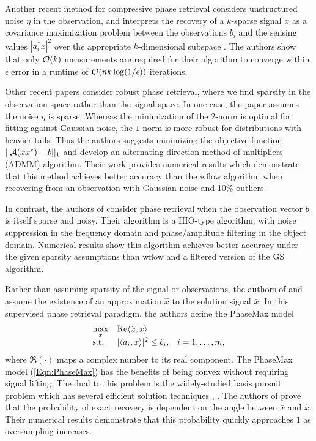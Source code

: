 Another recent method for compressive phase retrieval considers unstructured noise $\eta$ in the observation, and interprets the recovery of a $k$-sparse signal $x$ as a covariance maximization problem between the observations $b_i$ and the sensing values $|a_i^*x|^2$ over the appropriate $k$-dimensional subspace \cite{zhang2017fast}.  The authors show that only ${\mathcal O}(k)$ measurements are required for their algorithm to converge within $\epsilon$ error in a runtime of ${\mathcal O}(nk \log(1/ \epsilon))$ iterations.




Other recent papers consider robust phase retrieval, where we find sparsity in the observation space rather than the signal space.  In one case, the paper \cite{jiang2017robust} assumes the noise $\eta$ is sparse.  Whereas the minimization of the $2$-norm is optimal for fitting against Gaussian noise, the $1$-norm is more robust for distributions with heavier tails.  Thus the authors suggests minimizing the objective function $||{\mathcal A}(xx^*) - b||_1$ and develop an alternating direction method of multipliers (ADMM) algorithm.  Their work provides numerical results which demonstrate that this method achieves better accuracy than the wflow algorithm when recovering from an observation with Gaussian noise and 10\% outliers.

In contrast, the authors of \cite{katkovnik2017phase} consider phase retrieval when the observation vector $b$ is itself sparse and noisy.  Their algorithm is a HIO-type algorithm, with noise suppression in the frequency domain and phase/amplitude filtering in the object domain.  Numerical results show this algorithm achieves better accuracy under the given sparsity assumptions than wflow and a filtered version of the GS algorithm.





Rather than assuming sparsity of the signal or observations, the authors of \cite{goldstein2018phasemax} and \cite{bahmani2016phase} assume the existence of an approximation $\hat{x}$ to the solution signal $\bar{x}$.  In this supervised phase retrieval paradigm, the authors define the PhaseMax model
\begin{equation} 			\label{Eqn:PhaseMax}
\begin{array}{lll}
	\max\limits_x	&	\mathrm{Re} \langle \hat{x}, x \rangle 		\\
	\textnormal{s.t.} 			&	| \langle a_i, x \rangle |^2 \leq b_i, 	&	i = 1, \ldots, m,
\end{array}
\end{equation} 
where $\Re(\cdot)$ maps a complex number to its real component.  The PhaseMax model (\ref{Eqn:PhaseMax}) has the benefits of being convex without requiring signal lifting.  The dual to this problem is the widely-studied basis pursuit problem which has several efficient solution techniques \cite{chen2001atomic}, \cite{candes2006stable}.  The authors of \cite{goldstein2018phasemax} prove that the probability of exact recovery is dependent on the angle between $\bar{x}$ and $\hat{x}$.
Their numerical results demonstrate that this probability quickly approaches $1$ as oversampling increases.




